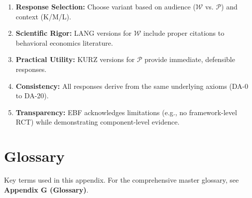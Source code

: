 \begin{tcolorbox}[colback=blue!5!white, colframe=blue!75!black,
    title=Key Takeaways]
\begin{enumerate}
    \item \textbf{Response Selection:} Choose variant based on audience ($\mathcal{W}$ vs. $\mathcal{P}$) and context (K/M/L).

    \item \textbf{Scientific Rigor:} LANG versions for $\mathcal{W}$ include proper citations to behavioral economics literature.

    \item \textbf{Practical Utility:} KURZ versions for $\mathcal{P}$ provide immediate, defensible responses.

    \item \textbf{Consistency:} All responses derive from the same underlying axioms (DA-0 to DA-20).

    \item \textbf{Transparency:} EBF acknowledges limitations (e.g., no framework-level RCT) while demonstrating component-level evidence.
\end{enumerate}
\end{tcolorbox}

\section{Glossary}
\label{sec:da2-glossary}

Key terms used in this appendix. For the comprehensive master glossary, see \textbf{Appendix G (Glossary)}.


